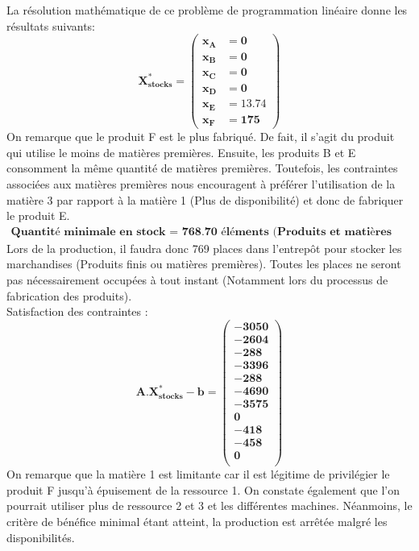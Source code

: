 \documentclass[12pt]{article}
\begin{document}
La résolution mathématique de ce problème de programmation linéaire donne les résultats suivants:
\begin{equation*}
\boldsymbol{X^{*}_{stocks} = 
   \left (
   \begin{aligned}
      x_{A} &= 0 \\
      x_{B} &= 0 \\
      x_{C} &= 0 \\
      x_{D} &= 0 \\
      x_{E} &= 13.74 \\
      x_{F} &= 175 
   \end{aligned}
   \right )
 } 
\end{equation*}
On remarque que le produit F est le plus fabriqué. De fait, il s'agit du produit qui utilise le moins de matières premières. Ensuite, les produits B et E consomment la même quantité de matières premières. Toutefois, les contraintes associées aux matières premières nous encouragent à préférer l'utilisation de la matière 3 par rapport à la matière 1 (Plus de disponibilité) et donc de fabriquer le produit E.
\begin{align*}
\textbf{Quantité minimale en stock = 768.70 éléments (Produits et matières premières)}
\end{align*}
Lors de la production, il faudra donc 769 places dans l'entrepôt pour stocker les marchandises (Produits finis ou matières premières). Toutes les places ne seront pas nécessairement occupées à tout instant (Notamment lors du processus de fabrication des produits).
\\
Satisfaction des contraintes : 
\begin{equation*}
\boldsymbol{A.X^{*}_{stocks} - b = 
   \left (
   \begin{aligned}
      -3050 \\
      -2604 \\
      -288 \\
      -3396\\
      -288 \\
      -4690 \\
      -3575 \\
      0\\
      -418 \\
      -458\\
      0\\
   \end{aligned}
   \right )
 } 
\end{equation*}
On remarque que la matière 1 est limitante car il est légitime de privilégier le produit F jusqu'à épuisement de la ressource 1.
On constate également que l'on pourrait utiliser plus de ressource 2 et 3 et les différentes machines. Néanmoins, le critère de bénéfice minimal étant atteint, la production est arrêtée malgré les disponibilités.
\end{document}
